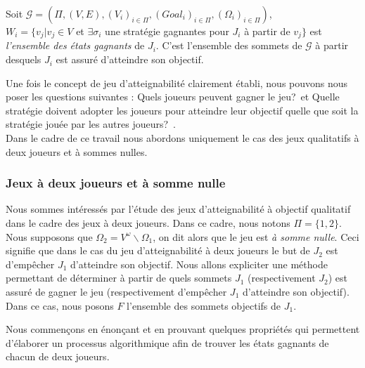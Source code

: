 	
	\begin{defi}
		Soit $\mathcal{G} = (\Pi,(V,E),(V_{i})_{i \in \Pi}, (Goal_{i})_{i \in \Pi},(\Omega _{i})_{i \in \Pi})$,\\
		$W_{i} = \{ v_{j} |v_j \in V$ et $\exists \sigma _{i}$ une stratégie gagnantes pour $J_{i}$ à partir de $v_{j}\}$ est \textit{l'ensemble des états gagnants} de $J_{i}$. C'est l'ensemble des sommets de $\mathcal{G}$ à partir desquels $J_{i}$ est assuré d'atteindre son objectif.
	\end{defi}
	
	
	
	Une fois le concept de jeu d'atteignabilité clairement établi, nous pouvons nous poser les questions suivantes : \og Quels joueurs peuvent gagner le jeu?\fg~et \og Quelle stratégie doivent adopter les joueurs pour atteindre leur objectif quelle que soit la stratégie jouée par les autres joueurs?\fg~. \\
	
Dans le cadre de ce travail nous abordons uniquement le cas des jeux qualitatifs à deux joueurs et à sommes nulles.
	
	
	\subsubsection*{Jeux à deux joueurs et à somme nulle}
	Nous sommes intéressés par l'étude des jeux d'atteignabilité à objectif qualitatif dans le cadre des jeux à deux joueurs. Dans ce cadre, nous notons $\Pi = \{ 1,2\}$. Nous supposons que $\Omega _{2} = V^{\omega}\backslash \Omega _{1}$, on dit alors que le jeu est \textit{à somme nulle}. Ceci signifie que dans le cas du jeu d'atteignabilité à deux joueurs le but de $J_{2}$ est d'empêcher $J_{1}$ d'atteindre son objectif. Nous allons expliciter une méthode permettant de déterminer à partir de quels sommets $J_{1}$ (respectivement $J_{2}$) est assuré de gagner le jeu (respectivement d'empêcher $J_{1}$ d'atteindre son objectif). Dans ce cas, nous posons $F$ l'ensemble des sommets objectifs de $J_{1}$.
	
	Nous commençons en énonçant et en prouvant quelques propriétés qui permettent d'élaborer un processus algorithmique afin de trouver les états gagnants de chacun de deux joueurs.
	
